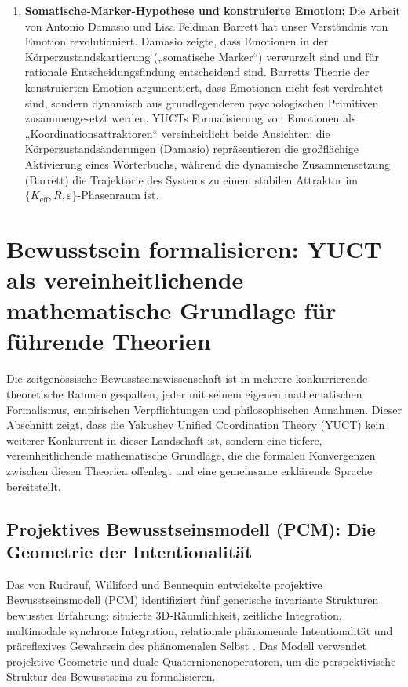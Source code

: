 \documentclass[12pt,a4paper]{article}
\begin{document}
\begin{enumerate}
		\item \textbf{Somatische‑Marker‑Hypothese und konstruierte Emotion:} Die Arbeit von Antonio Damasio und Lisa Feldman Barrett hat unser Verständnis von Emotion revolutioniert. Damasio zeigte, dass Emotionen in der Körperzustandskartierung („somatische Marker“) verwurzelt sind und für rationale Entscheidungsfindung entscheidend sind. Barretts Theorie der konstruierten Emotion argumentiert, dass Emotionen nicht fest verdrahtet sind, sondern dynamisch aus grundlegenderen psychologischen Primitiven zusammengesetzt werden. YUCTs Formalisierung von Emotionen als „Koordinationsattraktoren“ vereinheitlicht beide Ansichten: die Körperzustandsänderungen (Damasio) repräsentieren die großflächige Aktivierung eines Wörterbuchs, während die dynamische Zusammensetzung (Barrett) die Trajektorie des Systems zu einem stabilen Attraktor im \(\{K_{\mathrm{eff}}, R, \varepsilon\}\)-Phasenraum ist.
	\end{enumerate}
	
	\section{Bewusstsein formalisieren: YUCT als vereinheitlichende mathematische Grundlage für führende Theorien}
	
	Die zeitgenössische Bewusstseinswissenschaft ist in mehrere konkurrierende theoretische Rahmen gespalten, jeder mit seinem eigenen mathematischen Formalismus, empirischen Verpflichtungen und philosophischen Annahmen. Dieser Abschnitt zeigt, dass die Yakushev Unified Coordination Theory (YUCT) kein weiterer Konkurrent in dieser Landschaft ist, sondern eine tiefere, vereinheitlichende mathematische Grundlage, die die formalen Konvergenzen zwischen diesen Theorien offenlegt und eine gemeinsame erklärende Sprache bereitstellt.
	
	\subsection{Projektives Bewusstseinsmodell (PCM): Die Geometrie der Intentionalität}
	
	Das von Rudrauf, Williford und Bennequin entwickelte projektive Bewusstseinsmodell (PCM) identifiziert fünf generische invariante Strukturen bewusster Erfahrung: situierte 3D‑Räumlichkeit, zeitliche Integration, multimodale synchrone Integration, relationale phänomenale Intentionalität und präreflexives Gewahrsein des phänomenalen Selbst \cite{Rudrauf2023}. Das Modell verwendet projektive Geometrie und duale Quaternionenoperatoren, um die perspektivische Struktur des Bewusstseins zu formalisieren.
	
\end{document}
